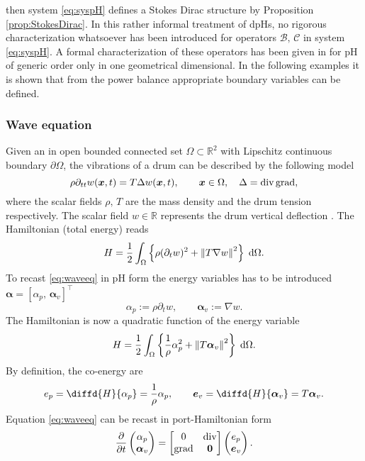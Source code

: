 then system \eqref{eq:syspH} defines a Stokes Dirac structure by Proposition \ref{prop:StokesDirac}.  In this rather informal treatment of dpHs, no rigorous characterization whatsoever has been introduced for operators $\mathcal{B,\, C}$ in system \eqref{eq:syspH}. A formal characterization of these operators has been given in \cite{legorrec2005} for pH of generic order only in one geometrical dimensional. In the following examples it is shown that from the power balance appropriate boundary variables can be defined.

\subsubsection{Wave equation}\label{sec:waveeq}

Given an in open bounded connected set $\Omega \subset \mathbb{R}^2$ with Lipschitz continuous boundary $\partial\Omega$, the vibrations of a drum can be described by the following model
\begin{equation}\label{eq:waveeq}
\rho \partial_{tt} w(\bm{x}, t) = T \Delta w(\bm{x}, t), \qquad \bm{x}\in \Omega, \quad \Delta = \operatorname{div}\operatorname*{grad},
\end{equation}
where the scalar fields $\rho, \, T$ are the mass density and the drum tension respectively.
The scalar field $w \in \mathbb{R}$ represents the drum vertical deflection . The Hamiltonian (total energy) reads
\[
H = \frac{1}{2} \int_{\Omega} \left\{\rho(\partial_t w)^2 + \norm{T \nabla w}^2 \right\} \d\Omega.
\]
To recast \eqref{eq:waveeq} in pH form the energy variables has to be introduced $\bm{\alpha} = [\alpha_p, \, \bm{\alpha}_v]^\top$
\[
\alpha_p := \rho \partial_t w, \qquad \bm{\alpha}_v := \nabla w.
\] 
The Hamiltonian is now a quadratic function of the energy variable
\[
H = \frac{1}{2} \int_{\Omega} \left\{\frac{1}{\rho}\alpha_p^2 + \norm{T \bm{\alpha}_v}^2 \right\} \d\Omega.
\]
By definition, the co-energy are 
\[
e_p = \diffd{H}{\alpha_p} = \frac{1}{\rho}\alpha_p, \qquad \bm{e}_v = \diffd{H}{\bm{\alpha}_v} = T \bm{\alpha}_v.
\]
Equation \eqref{eq:waveeq} can be recast in port-Hamiltonian form
\[
\diffp{}{t}
\begin{pmatrix}
\alpha_p \\
\bm{\alpha}_v \\
\end{pmatrix} = 
\begin{bmatrix}
0 & \div \\
\grad & \bm{0}
\end{bmatrix}
\begin{pmatrix}
e_p \\
\bm{e}_v \\
\end{pmatrix}.
\]
